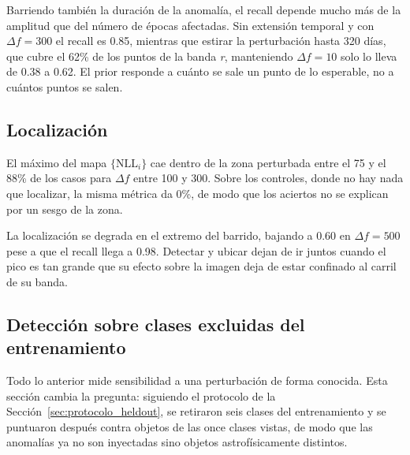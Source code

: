 Barriendo también la duración de la anomalía, el recall depende mucho más de la amplitud que del número de épocas afectadas. Sin extensión temporal y con $\Delta f = 300$ el recall es 0.85, mientras que estirar la perturbación hasta 320 días, que cubre el 62\% de los puntos de la banda \textit{r}, manteniendo $\Delta f = 10$ solo lo lleva de 0.38 a 0.62. El prior responde a cuánto se sale un punto de lo esperable, no a cuántos puntos se salen.

\begin{figure}[H]
\centering
{}
\end{figure}

\subsection{Localización}

El máximo del mapa $\{\mathrm{NLL}_i\}$ cae dentro de la zona perturbada entre el 75 y el 88\% de los casos para $\Delta f$ entre 100 y 300. Sobre los controles, donde no hay nada que localizar, la misma métrica da 0\%, de modo que los aciertos no se explican por un sesgo de la zona.

La localización se degrada en el extremo del barrido, bajando a 0.60 en $\Delta f = 500$ pese a que el recall llega a 0.98. Detectar y ubicar dejan de ir juntos cuando el pico es tan grande que su efecto sobre la imagen deja de estar confinado al carril de su banda.

\subsection{Detección sobre clases excluidas del entrenamiento}
\label{sec:res_heldout}

Todo lo anterior mide sensibilidad a una perturbación de forma conocida. Esta sección cambia la pregunta: siguiendo el protocolo de la Sección~\ref{sec:protocolo_heldout}, se retiraron seis clases del entrenamiento y se puntuaron después contra objetos de las once clases vistas, de modo que las anomalías ya no son inyectadas sino objetos astrofísicamente distintos.

